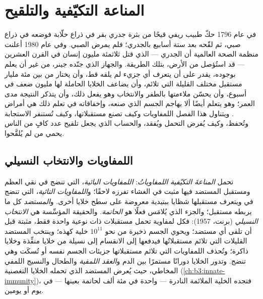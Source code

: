 \chapter{المناعة التكيّفية والتلقيح}\label{ch:b3:adaptive-immunity}

في عام 1796 حكّ طبيب ريفي قيحًا من بثرة جدري بقر في ذراع
حلّابة فوضعه في ذراع صبي، ثم لقّحه بعد ستة أسابيع بالجدري؛
فلم يمرض الصبي. وفي عام 1980 أعلنت منظمة الصحة العالمية أن
الجدري --- الذي قتل ثلاثمئة مليون إنسان في القرن العشرين
--- قد استُؤصل من الأرض، بتلك الطريقة. والجهاز الذي جنّده
جينر، من غير أن يعلم بوجوده، يقدر على أن يتعرف أي جزيء لم
يلقه قط، وأن يختار من بين مئة مليار مستقبل مختلف القليلة
التي تلائم، وأن يضاعف الخلايا الحاملة لها مليون ضعف في
أسبوع، وأن يحسّن ملاءمتها بالطفر والانتخاب وهو يفعل ذلك،
وأن يتذكر النتيجة مدى العمر؛ وهو يتعلم أيضًا ألا يهاجم
الجسم الذي صنعه، وإخفاقاته في تعلم ذلك هي أمراض . ويتناول هذا الفصل اللمفاويات وكيف تصنع مستقبلاتها،
وكيف تُستنفر الاستجابة وتُحفظ، وكيف يُفرض التحمل ويُفقد،
والحساب الذي يجعل تلقيح عدد كافٍ من الناس يحمي من لم
يُلقَّحوا.

\section{اللمفاويات والانتخاب النسيلي}

\begin{definition}\label{def:b3:adaptive-immunity:lymphocytes}
تحمل \emph{المناعةَ التكيّفية} \emph{اللمفاوياتُ}:
\emph{اللمفاويات البائية}، التي تنضج في نقي العظم ومستقبل
المستضد فيها \emph{} مثبت في الغشاء تفرزه لاحقًا؛
و\emph{اللمفاويات التائية}، التي تنضج في  ويتعرف
مستقبلها شظايا ببتيدية معروضة على سطح خلايا أخرى.
و\emph{المستضد} كل ما يربطه مستقبل؛ والجزء الذي يُلامَس
فعلًا هو \emph{الحاتمة}. والحقيقة المؤسِّسة هي
\emph{الانتخاب النسيلي} (برنت، 1957): فكل لمفاوية تحمل
مستقبلات ذات نوعية واحدة فقط، مثبتة قبل أن تلقى أي مستضد؛
ويحوي الجسم ذخيرة من نحو $10^{11}$ خلية كهذه؛ وينتخب
المستضد القليلات التي تلائم مستقبلاتُها فيدفعها إلى الانقسام
إلى نسيلة من خلايا منفِّذة وخلايا ذاكرة؛ وتُحذف اللمفاويات
التي تلائم مستقبلاتها جزيئات الجسم نفسه أو تُسكَت وهي
تنضج. وتدور الخلايا دورانًا مستمرًا بين الدم و\emph{العقد
اللمفية} والطحال والنسيج اللمفي المخاطي، حيث يُعرض المستضد
الذي تحمله الخلايا التغصنية (\cref{ch:b3:innate-immunity})،
فتجده الخلية الملائمة النادرة --- واحدة في مئة ألف لحاتمة
بعينها --- في يوم أو يومين.
\end{definition}

